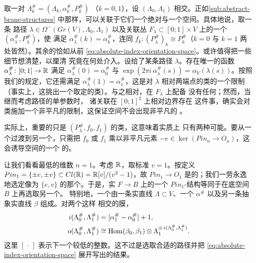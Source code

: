 取一对\trLinear\trLagrange\trBrane{} $\Lambda_k^\#=(\Lambda_k,\alpha_k^\#,P_k^\#)$
（$k=0,1$），设 $(\Lambda_0,\Lambda_1)$ \trTransverse{}相交。正如\cref{sub:abstract-brane-structures}
中那样，可以关联于它们一个绝对\trIndex{}与一个\trOrientation{}空间。具体地说，取一条
路径 $\lambda\in\Omega^-(Gr(V),\Lambda_0,\Lambda_1)$ 以及关联丛
$F_\lambda\subset[0;1]\times V$ 上的一个\trBraneStructure{} $(\alpha_\lambda^\#,P_\lambda^\#)$，使%
\trGrading{}满足 $\alpha_\lambda^\#(k)=\alpha_k^\#$，连同\trIsomorphism{}
$f_k\colon(P_\lambda^\#)_k\cong P_k^\#$（$k=0$ 与 $k=1$ 两处皆然）。其余的恰如从前
\eqref{eq:absolute-index-orientation-space}。或许值得把一些细节想清楚，以厘清%
\trBraneStructure{}究竟在何处介入。设给了某条路径 $\lambda$。存在唯一的函数
$\alpha_\lambda^\#\colon[0;1]\to\mathbb{R}$ 满足 $\alpha_\lambda^\#(0)=\alpha_0^\#$ 与
$\exp(2\pi i\,\alpha_\lambda^\#(s))=\alpha_V(\lambda(s))$。按照我们的规定，它还需满足
$\alpha_\lambda^\#(1)=\alpha_1^\#$，这是对 $\lambda$ 相对两端点的\trHomotopy{}类的一个限制
（事实上，这挑出一个取定的\trHomotopy{}类）。与之相对，在 $F_\lambda$ 上配备%
\trPinStructure{}没有任何\trObstruction{}；然而，当继而考虑路径的单参数\trFamily{}时，
诸关联\trVectorBundle{}在 $[0;1]^2$ 上相对边界存在 \trPinStructure{}这件事，确实会对%
\trHomotopy{}类施加一个非平凡的限制，这保证\trOrientation{}空间不会出现非平凡的%
\trMonodromy。
\begin{remark}\label{thm:brane-orientation-reversal}
实际上，重要的只是 $(P_\lambda^\#,f_0,f_1)$ 的\trIsomorphism{}类，这意味着实质上
只有两种可能。要从一个过渡到另一个，只需把 $f_0$ 或 $f_1$ 乘以非平凡元素
$-e\in\ker(Pin_n\to O_n)$，这会诱导\trOrientation{}空间的一个\trOrientationReversing{}
的\trAutomorphism。
\end{remark}
\begin{example}\label{thm:pin1-example}
让我们看看最低的维数 $n=1$。考虑 $\mathbb{R}$，取标准\trGenerator{} $v=1$。按定义
$Pin_1=\{\pm e,\pm v\}\subset Cl(\mathbb{R})=\mathbb{R}[v]/(v^2-1)$，故\trProjection{} $Pin_1\to O_1$
是\trSplitting{}的；我们一劳永逸地选定像为 $\{e,v\}$ 的那个\trSplitting。于是，实\trLineBundle{}
$F\to B$ 上的一个 $Pin_1$-结构等同于在底空间 $B$ 上再选取另一个\trRealLineBundle。
特别地，一个\trLinear\trLagrange\trBrane{}由一条实直线 $\Lambda\subset V$、一个%
\trRealValuedPhase{} $\alpha^\#$ 以及另一条抽象实直线 $\beta$ 组成。对两个这样%
\trTransverse{}相交的膜，
\begin{equation}\label{eq:pin1-index-orientation}
\begin{aligned}
i(\Lambda_0^\#,\Lambda_1^\#)&=[\alpha_1^\#-\alpha_0^\#]+1,\\
o(\Lambda_0^\#,\Lambda_1^\#)&\cong\operatorname{Hom}(\beta_0,\beta_1)
\otimes\Lambda_1^{\otimes\,i(\Lambda_0^\#,\Lambda_1^\#)}.
\end{aligned}
\end{equation}
这里 $[\,\cdot\,]$ 表示下一个较低的整数。这不过是选取合适的路径并把
\eqref{eq:absolute-index-orientation-space} 展开写出的结果。
\end{example}
